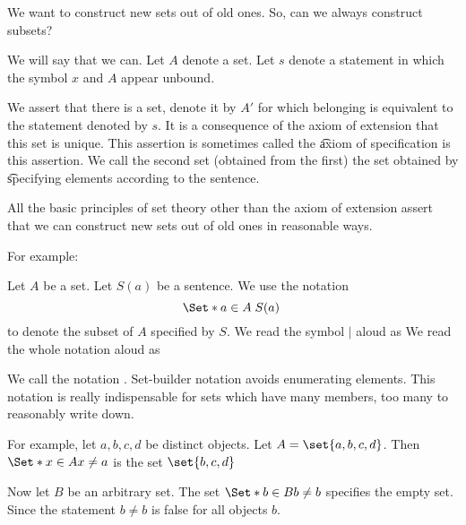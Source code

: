 

We want to construct new sets out of old ones.
So, can we always construct subsets?


We will say that we can.
Let $A$ denote a set.
Let $s$ denote a statement in which the symbol $x$ and $A$ appear unbound.

We assert that there is a set, denote it by $A'$ for which belonging is equivalent to the statement denoted by $s$.
It is a consequence of the axiom of extension that this set is unique.
This assertion is sometimes called the \t{axiom of specification} is this assertion.
We call the second set (obtained from the first) the set obtained by \t{specifying} elements according to the sentence.

All the basic principles of set theory other than the axiom of extension assert that we can construct new sets out of old ones in reasonable ways.

For example:
\begin{account}
\end{account}


Let $A$ be a set.
Let $S(a)$ be a sentence.
We use the notation
\[
  \Set*{a \in A}{\;S(a)\;}
\]
to denote the subset of $A$
specified by $S$.
We read the symbol $\mid$ aloud as
We read the whole notation aloud as

We call the notation
.
Set-builder notation avoids enumerating
elements.
This notation is really indispensable for
sets which have many members, too many
to reasonably write down.


For example, let $a, b, c, d$
be distinct objects.
Let $A = \set{a, b, c, d}$.
Then
$\Set*{x \in A}{x \neq a}$
is the set $\set{b, c, d}$

Now let $B$ be an arbitrary
set.
The set $\Set*{b \in B}{b \neq b}$
specifies the empty set.
Since the statement $b \neq b$ is
false for all objects $b$.

